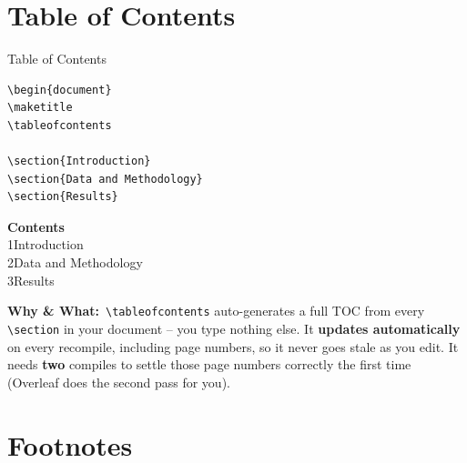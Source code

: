 \documentclass[11pt,aspectratio=169]{beamer}
\newcommand{\whybox}[1]{%
  \vspace{2pt}
  {\scriptsize\raggedright\textcolor{red!55!black}{\textbf{Why \& What:}}~#1\par}
}
\begin{document}
\section{Table of Contents}

\begin{frame}[fragile]{Table of Contents}
  \begin{lstlisting}
\begin{document}
\maketitle
\tableofcontents

\section{Introduction}
\section{Data and Methodology}
\section{Results}
  \end{lstlisting}
  \begin{outputbox}
    \small
    \textbf{Contents}\\[4pt]
    1\quad Introduction \\
    2\quad Data and Methodology \\
    3\quad Results 
  \end{outputbox}
  \whybox{\texttt{\textbackslash tableofcontents} auto-generates a full
  TOC from every \texttt{\textbackslash section} in your document --
  you type nothing else. It \textbf{updates automatically} on every
  recompile, including page numbers, so it never goes stale as you
  edit. It needs \textbf{two} compiles to settle those page numbers
  correctly the first time (Overleaf does the second pass for you).}
\end{frame}

\section{Footnotes}
\end{document}
